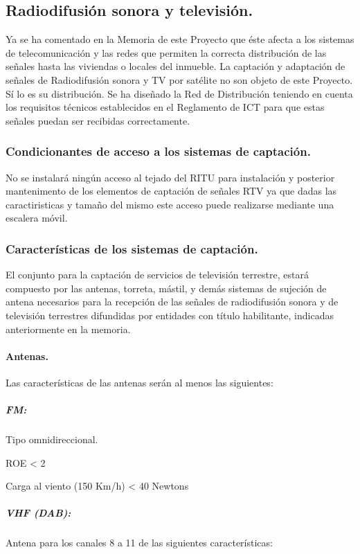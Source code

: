 \subsection{Radiodifusión sonora y televisión.}

Ya se ha comentado en la Memoria de este Proyecto que éste afecta a los sistemas de telecomunicación y las redes que permiten la correcta distribución de las señales hasta las viviendas o locales del inmueble.
La captación y adaptación de señales de Radiodifusión sonora y TV por satélite no son objeto de este Proyecto. Sí lo es su distribución.
Se ha diseñado la Red de Distribución teniendo en cuenta los requisitos técnicos establecidos en el Reglamento de ICT para que estas señales puedan ser recibidas correctamente.

\subsubsection{Condicionantes de acceso a los sistemas de captación.}

No se instalará ningún acceso al tejado del RITU para instalación y posterior mantenimento de los elementos de captación de señales RTV ya que dadas las caractiristicas y tamaño del mismo este acceso puede realizarse mediante una escalera móvil.

\subsubsection{Características de los sistemas de captación.}

El conjunto para la captación de servicios de televisión terrestre, estará compuesto por las antenas, torreta, mástil, y demás sistemas de sujeción de antena necesarios para la recepción de las señales de radiodifusión sonora y de televisión terrestres difundidas por entidades con título habilitante, indicadas anteriormente en la memoria.

\paragraph{Antenas.}

Las características de las antenas serán al menos las siguientes:

\subparagraph*{FM: }
Tipo omnidireccional.

ROE < 2 

Carga al viento (150 Km/h) < 40 Newtons

\subparagraph*{VHF (DAB): }
Antena para los canales 8 a 11 de las siguientes características:

